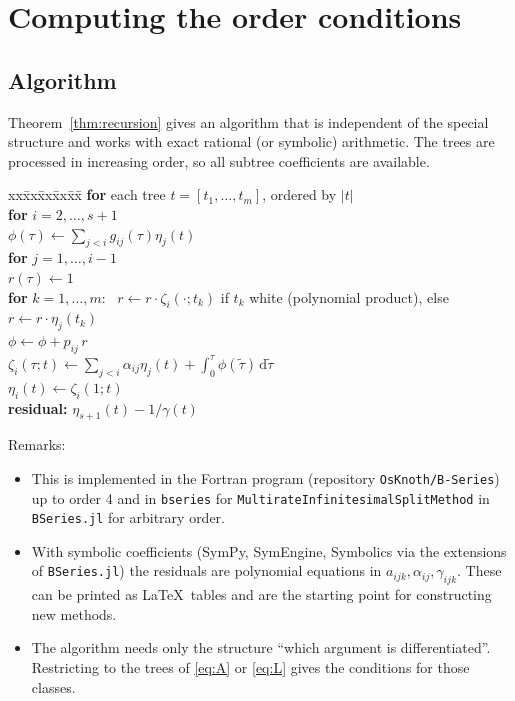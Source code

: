 \documentclass[11pt,a4paper]{article}
\theoremstyle{definition}
\theoremstyle{remark}
\newcommand{\dd}{\,\mathrm{d}}
\begin{document}
\section{Computing the order conditions}
\label{sec:algorithm}

\subsection{Algorithm}

Theorem~\ref{thm:recursion} gives an algorithm that is independent of the
special structure and works with exact rational (or symbolic)
arithmetic. The trees are processed in increasing order, so all subtree
coefficients are available.

\begin{center}
\begin{minipage}{0.9\linewidth}
\begin{tabbing}
xx\=xx\=xx\=xx\=xx\=\kill
\textbf{for} each tree $t=[t_1,\dots,t_m]$, ordered by $|t|$\\
\>\textbf{for} $i=2,\dots,s+1$\\
\>\>$\phi(\tau)\gets\sum_{j<i}g_{ij}(\tau)\eta_j(t)$\\
\>\>\textbf{for} $j=1,\dots,i-1$\\
\>\>\>$r(\tau)\gets1$\\
\>\>\>\textbf{for} $k=1,\dots,m$: \ $r\gets r\cdot\zeta_i(\cdot;t_k)$ if
       $t_k$ white (polynomial product), else $r\gets r\cdot\eta_j(t_k)$\\
\>\>\>$\phi\gets\phi+p_{ij}\,r$\\
\>\>$\zeta_i(\tau;t)\gets\sum_{j<i}\alpha_{ij}\eta_j(t)+\int_0^\tau\phi(\tilde\tau)\dd\tilde\tau$\\
\>\>$\eta_i(t)\gets\zeta_i(1;t)$\\
\textbf{residual:} $\eta_{s+1}(t)-1/\gamma(t)$
\end{tabbing}
\end{minipage}
\end{center}

Remarks:
\begin{itemize}
\item This is implemented in the Fortran program (repository
  \texttt{OsKnoth/B-Series}) up to order 4 and in \texttt{bseries} for
  \texttt{MultirateInfinitesimalSplitMethod} in \texttt{BSeries.jl}
  \cite{KetchesonRanocha2023} for arbitrary order.
\item With symbolic coefficients (SymPy, SymEngine, Symbolics via the
  extensions of \texttt{BSeries.jl}) the residuals are polynomial
  equations in $a_{ijk},\alpha_{ij},\gamma_{ijk}$. These can be printed as
  \LaTeX\ tables and are the starting point for constructing new methods.
\item The algorithm needs only the structure ``which argument is
  differentiated''. Restricting to the trees of \eqref{eq:A} or
  \eqref{eq:L} gives the conditions for those classes.
\end{itemize}
\end{document}
